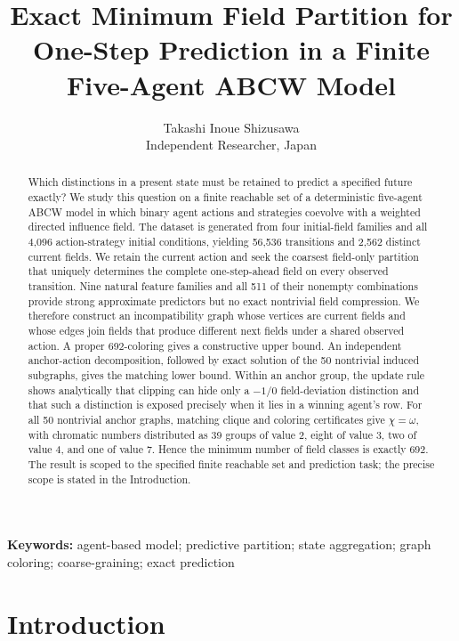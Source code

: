 \documentclass[
  11pt,
]{article}
\title{Exact Minimum Field Partition for One-Step Prediction in a Finite
Five-Agent ABCW Model}
\author{Takashi Inoue Shizusawa\\
\small Independent Researcher, Japan}
\date{}
\begin{document}
\maketitle
\begin{abstract}
Which distinctions in a present state must be retained to predict a
specified future exactly? We study this question on a finite reachable
set of a deterministic five-agent ABCW model in which binary agent
actions and strategies coevolve with a weighted directed influence
field. The dataset is generated from four initial-field families and all
4,096 action-strategy initial conditions, yielding 56,536 transitions
and 2,562 distinct current fields. We retain the current action and seek
the coarsest field-only partition that uniquely determines the complete
one-step-ahead field on every observed transition. Nine natural feature
families and all 511 of their nonempty combinations provide strong
approximate predictors but no exact nontrivial field compression. We
therefore construct an incompatibility graph whose vertices are current
fields and whose edges join fields that produce different next fields
under a shared observed action. A proper 692-coloring gives a
constructive upper bound. An independent anchor-action decomposition,
followed by exact solution of the 50 nontrivial induced subgraphs, gives
the matching lower bound. Within an anchor group, the update rule shows
analytically that clipping can hide only a \(-1/0\) field-deviation
distinction and that such a distinction is exposed precisely when it
lies in a winning agent's row. For all 50 nontrivial anchor graphs,
matching clique and coloring certificates give \(\chi=\omega\), with
chromatic numbers distributed as 39 groups of value 2, eight of value 3,
two of value 4, and one of value 7. Hence the minimum number of field
classes is exactly 692. The result is scoped to the specified finite reachable set and prediction task; the precise scope is stated in the Introduction.
\end{abstract}

\noindent\textbf{Keywords:} agent-based model; predictive partition;
state aggregation; graph coloring; coarse-graining; exact prediction

\vspace{0.75em}

\section{Introduction}\label{introduction}
\end{document}
